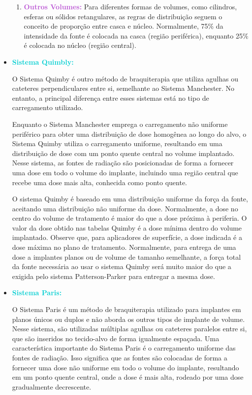 \documentclass[11pt,a4paper]{article}
\begin{document}
\begin{itemize}
\begin{enumerate}[label=\textcolor{CarnationPink}{(\roman*)}]
					\item \textcolor{MediumOrchid}{\textbf{Outros Volumes:}} Para diferentes formas de volumes, como cilindros, esferas ou sólidos retangulares, as regras de distribuição seguem o conceito de proporção entre casca e núcleo. Normalmente, 75\% da intensidade da fonte é colocada na casca (região periférica), enquanto 25\% é colocada no núcleo (região central).
				\end{enumerate}
				
				\item \textcolor{DarkTurquoise}{\textbf{Sistema Quimbly:}}
				
				O Sistema Quimby é outro método de braquiterapia que utiliza agulhas ou cateteres perpendiculares entre si, semelhante ao Sistema Manchester. No entanto, a principal diferença entre esses sistemas está no tipo de carregamento utilizado.

				Enquanto o Sistema Manchester emprega o carregamento não uniforme periférico para obter uma distribuição de dose homogênea ao longo do alvo, o Sistema Quimby utiliza o carregamento uniforme, resultando em uma distribuição de dose com um ponto quente central no volume implantado. Nesse sistema, as fontes de radiação são posicionadas de forma a fornecer uma dose  em todo o volume do implante, incluindo uma região central que recebe uma dose mais alta, conhecida como ponto quente.

				O sistema Quimby é baseado em uma distribuição uniforme da força da fonte, aceitando uma distribuição não uniforme da dose. Normalmente, a dose no centro do volume de tratamento é maior do que a dose próxima à periferia. O valor da dose obtido nas tabelas Quimby é a dose mínima dentro do volume implantado. Observe que, para aplicadores de superfície, a dose indicada é a dose máxima no plano de tratamento. Normalmente, para entrega de uma dose a implantes planos ou de volume de tamanho semelhante, a força total da fonte necessária ao usar o sistema Quimby será muito maior do que a exigida pelo sistema Patterson-Parker para entregar a mesma dose.
				
				\item \textcolor{DarkTurquoise}{\textbf{Sistema Paris:}}
				
				O Sistema Paris é um método de braquiterapia utilizado para implantes em planos únicos ou duplos e não aborda os outros tipos de implante de volume. Nesse sistema, são utilizadas múltiplas agulhas ou cateteres paralelos entre si, que são inseridos no tecido-alvo de forma igualmente espaçada. Uma característica importante do Sistema Paris é o carregamento uniforme das fontes de radiação. Isso significa que as fontes são colocadas de forma a fornecer uma dose não uniforme em todo o volume do implante, resultando em um ponto quente central, onde a dose é mais alta, rodeado por uma dose gradualmente decrescente.


\end{itemize}
\end{document}
